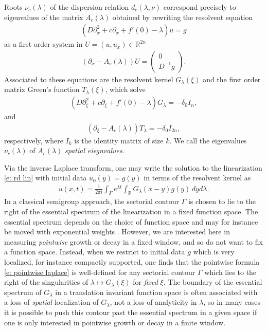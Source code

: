 \documentclass[11pt]{article}
\newcommand{\R}{\mathbb{R}}
\numberwithin{equation}{section}
\numberwithin{prop}{section}
\begin{document}
Roots $\nu_c(\lambda)$ of the dispersion relation $d_c(\lambda, \nu)$ correspond precisely to eigenvalues of the matrix $A_c (\lambda)$ obtained by rewriting the resolvent equation
\begin{align}
(D \partial_x^2 + c \partial_x + f'(0) - \lambda) u = g
\end{align}
as a first order system in $U = (u, u_x) \in \R^{2n}$
\begin{align}
(\partial_x - A_c (\lambda)) U = \begin{pmatrix} 0 \\ D^{-1} g \end{pmatrix}. 
\end{align}
Associated to these equations are the resolvent kernel $G_\lambda (\xi)$ and the first order matrix Green's function $T_\lambda(\xi)$, which solve
\begin{align}
(D \partial_\xi^2 + c \partial_\xi + f'(0) - \lambda) G_\lambda = - \delta_0 I_n,  
\end{align}
and
\begin{align}
(\partial_\xi - A_c (\lambda)) T_\lambda = - \delta_0 I_{2n},
\end{align}
respectively, where $I_k$ is the identity matrix of size $k$. We call the eigenvalues $\nu_c(\lambda)$ of $A_c(\lambda)$ \emph{spatial eiegnvalues}. 

Via the inverse Laplace transform, one may write the solution to the linearization \eqref{e: rd lin} with initial data $u_0(y) = g(y)$ in terms of the resolvent kernel as
\begin{align} 
u(x,t) = \frac{1}{2 \pi i} \int_\Gamma e^{\lambda t} \int_\R G_\lambda(x-y) g(y) \, dy d \lambda. \label{e: pointwise laplace}
\end{align}
In a classical semigroup approach, the sectorial contour $\Gamma$ is chosen to lie to the right of the essential spectrum of the linearization in a fixed function space. The essential spectrum depends on the choice of function space and may for instance be moved with exponential weights \cite{Sattinger}. However, we are interested here in measuring \emph{pointwise} growth or decay in a fixed window, and so do not want to fix a function space. Instead, when we restrict to initial data $g$ which is very localized, for instance compactly supported, one finds that the pointwise formula \eqref{e: pointwise laplace} is well-defined for any sectorial contour $\Gamma$ which lies to the right of the singularities of $\lambda \mapsto G_\lambda(\xi)$ for \emph{fixed} $\xi$. The boundary of the essential spectrum of $G_\lambda$ in a translation invariant function space is often associated with a loss of \emph{spatial} localization of $G_\lambda$, not a loss of analyticity in $\lambda$, so in many cases it is possible to push this contour past the essential spectrum in a given space if one is only interested in pointwise growth or decay in a finite window. 
\end{document}
